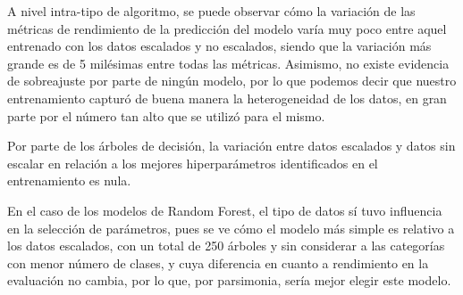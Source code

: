 \documentclass[
  10pt,
]{article}
\begin{document}
\begin{table}[!h]
\centering
\caption{\label{tab:general_res}Resultados completos del entrenamiento y reporte de clasificación de la evaluación}
\centering
{}
\end{table}

A nivel intra-tipo de algoritmo, se puede observar cómo la variación de
las métricas de rendimiento de la predicción del modelo varía muy poco
entre aquel entrenado con los datos escalados y no escalados, siendo que
la variación más grande es de 5 milésimas entre todas las métricas.
Asimismo, no existe evidencia de sobreajuste por parte de ningún modelo,
por lo que podemos decir que nuestro entrenamiento capturó de buena
manera la heterogeneidad de los datos, en gran parte por el número tan
alto que se utilizó para el mismo.

Por parte de los árboles de decisión, la variación entre datos escalados
y datos sin escalar en relación a los mejores hiperparámetros
identificados en el entrenamiento es nula.

En el caso de los modelos de Random Forest, el tipo de datos sí tuvo
influencia en la selección de parámetros, pues se ve cómo el modelo más
simple es relativo a los datos escalados, con un total de 250 árboles y
sin considerar a las categorías con menor número de clases, y cuya
diferencia en cuanto a rendimiento en la evaluación no cambia, por lo
que, por parsimonia, sería mejor elegir este modelo.
\end{document}
